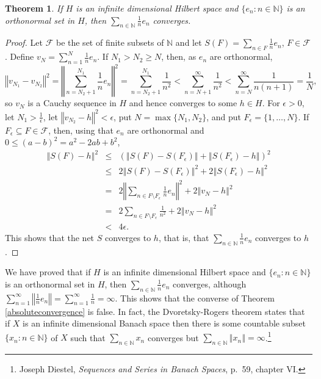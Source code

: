\documentclass{article}
\newcommand{\norm}[1]{\left\Vert #1 \right\Vert}
\newtheorem{theorem}{Theorem}
\begin{document}
\begin{theorem}
If $H$ is an infinite dimensional Hilbert space and $\{e_n: n \in \mathbb{N}\}$ is an orthonormal set in $H$, then
$\sum_{n \in \mathbb{N}} \frac{1}{n}e_n$ converges.
\end{theorem}
\begin{proof}
Let $\mathscr{F}$ be the set of finite subsets of $\mathbb{N}$ and let $S(F)=\sum_{n \in F} \frac{1}{n}e_n$, $F \in \mathscr{F}$. 
Define $v_N = \sum_{n=1}^N \frac{1}{n} e_n$. If $N_1 > N_2 \geq N$, then, as $e_n$ are orthonormal,
\[
\norm{v_{N_1}-v_{N_2}}^2 = \norm{\sum_{n=N_2+1}^{N_1} \frac{1}{n}e_n}^2 = \sum_{n=N_2+1}^{N_1} \frac{1}{n^2}
< \sum_{n=N+1}^\infty \frac{1}{n^2}<\sum_{n=N}^\infty \frac{1}{n(n+1)}=\frac{1}{N},
\]
so $v_N$ is a Cauchy sequence in $H$ and hence converges to some $h \in H$. For $\epsilon>0$, let $N_1>\frac{1}{\epsilon}$,
let $\norm{v_{N_2} - h}^2<\epsilon$, put
$N=\max\{N_1,N_2\}$, and put $F_\epsilon=\{1,\ldots,N\}$. If $F_\epsilon \subseteq F \in \mathscr{F}$, then,
using that $e_n$ are orthonormal and $0 \leq (a-b)^2 = a^2-2ab+b^2$,
\begin{eqnarray*}
\norm{S(F)-h}^2 &\leq& \left( \norm{S(F)-S(F_\epsilon)} + \norm{S(F_\epsilon)-h}\right)^2\\
&\leq&2\norm{S(F)-S(F_\epsilon)}^2 +2 \norm{S(F_\epsilon)-h}^2\\
&=&2\norm{\sum_{n \in F \setminus F_\epsilon} \frac{1}{n}e_n}^2+2\norm{v_N-h}^2\\
&=&2\sum_{n \in F \setminus F_\epsilon} \frac{1}{n^2} + 2\norm{v_N-h}^2\\
&<&4\epsilon.
\end{eqnarray*}
This shows that the net $S$ converges to $h$, that is, that $\sum_{n \in \mathbb{N}} \frac{1}{n}e_n$ converges to $h$.
\end{proof}

We have proved that if $H$ is an infinite dimensional Hilbert space and $\{e_n:n \in \mathbb{N}\}$ is an orthonormal
set in $H$, then $\sum_{n \in \mathbb{N}} \frac{1}{n}e_n$
converges, although $\sum_{n=1}^\infty \norm{\frac{1}{n}e_n} = \sum_{n=1}^\infty \frac{1}{n} = \infty$. This shows that the converse
of Theorem \ref{absoluteconvergence} is false. In fact, the Dvoretsky-Rogers
theorem states that if $X$ is an infinite dimensional Banach space then there is some countable subset $\{x_n: n \in \mathbb{N}\}$
of $X$ such that $\sum_{n \in \mathbb{N}} x_n$ converges but $\sum_{n \in \mathbb{N}} \norm{x_n} = \infty$.\footnote{Joseph
Diestel, {\em Sequences and Series in Banach Spaces}, p.~59, chapter VI.}
\end{document}
